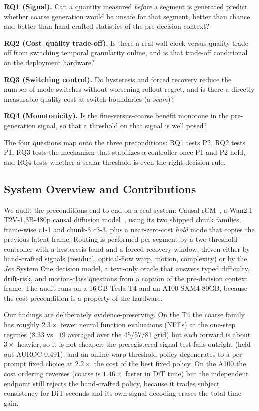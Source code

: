 \documentclass[journal]{IEEEtran}
\newcommand{\cfine}{\textup{c1-1}}
\newcommand{\ccoarse}{\textup{c3-3}}
\begin{document}
\textbf{RQ1 (Signal).} Can a quantity measured \emph{before} a segment is generated predict whether coarse generation would be unsafe for that segment, better than chance and better than hand-crafted statistics of the pre-decision context?

\textbf{RQ2 (Cost--quality trade-off).} Is there a real wall-clock versus quality trade-off from switching temporal granularity online, and is that trade-off conditional on the deployment hardware?

\textbf{RQ3 (Switching control).} Do hysteresis and forced recovery reduce the number of mode switches without worsening rollout regret, and is there a directly measurable quality cost at switch boundaries (a \emph{seam})?

\textbf{RQ4 (Monotonicity).} Is the fine-versus-coarse benefit monotone in the pre-generation signal, so that a threshold on that signal is well posed?

The four questions map onto the three preconditions: RQ1 tests P2, RQ2 tests P1, RQ3 tests the mechanism that stabilizes a controller once P1 and P2 hold, and RQ4 tests whether a scalar threshold is even the right decision rule.

\subsection{System Overview and Contributions}
We audit the preconditions end to end on a real system: Causal-rCM~\cite{zhengCausalrCMUnifiedTeacherForcing2026}, a Wan2.1-T2V-1.3B-480p causal diffusion model~\cite{wan2025wan}, using its two shipped chunk families, frame-wise \cfine{} and chunk-3 \ccoarse, plus a near-zero-cost \emph{hold} mode that copies the previous latent frame. Routing is performed per segment by a two-threshold controller with a hysteresis band and a forced recovery window, driven either by hand-crafted signals (residual, optical-flow warp, motion, complexity) or by the \emph{Jev} System One decision model, a text-only oracle that answers typed difficulty, drift-risk, and motion-class questions from a caption of the pre-decision context frame. The audit runs on a 16\,GB Tesla T4 and an A100-SXM4-80GB, because the cost precondition is a property of the hardware.

Our findings are deliberately evidence-preserving. On the T4 the coarse family has roughly $2.3\times$ fewer neural function evaluations (NFEs) at the one-step regimes ($8.33$ vs.\ $19$ averaged over the 45/57/81 grid) but each forward is about $3\times$ heavier, so it is not cheaper; the preregistered signal test fails outright (held-out AUROC $0.491$); and an online warp-threshold policy degenerates to a per-prompt fixed choice at $2.2\times$ the cost of the best fixed policy. On the A100 the cost ordering reverses (coarse is $1.46\times$ faster in DiT time) but the independent endpoint still rejects the hand-crafted policy, because it trades subject consistency for DiT seconds and its own signal decoding erases the total-time gain.
\end{document}
